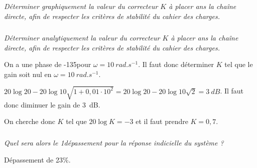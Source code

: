 \documentclass[10pt,fleqn]{article} %
\begin{document}
\begin{multicols}{2}
\subparagraph{}\textit{Déterminer graphiquement la valeur du correcteur $K$ à placer ans la chaîne directe, afin de respecter les critères de stabilité du cahier des charges.}

\subparagraph{}\textit{Déterminer analytiquement la valeur du correcteur $K$ à placer ans la chaîne directe, afin de respecter les critères de stabilité du cahier des charges.}
\ifprof
\begin{corrige}
On a une phase de -135\degres pour $\omega=\SI{10}{rad.s^{-1}}$. Il faut donc déterminer $K$ tel que le gain soit nul en $\omega=\SI{10}{rad.s^{-1}}$.

$20\log 20 - 20\log 10\sqrt{1+0,01\cdot 10^2}=20\log 20 - 20\log 10\sqrt{2}=\SI{3}{dB}$. Il faut donc diminuer le gain de \SI{3}{dB}.

On cherche donc $K$ tel que $20 \log K = -3$ et il faut prendre $K=0,7$.
\end{corrige}
\else
\fi

\subparagraph{}\textit{Quel sera alors le 1\ier dépassement pour la réponse indicielle du système ?}
\ifprof
\begin{corrige}
Dépassement de 23\%.
\end{corrige}
\else
\fi

\ifprof
\else
\end{multicols}
\fi
\end{document}

